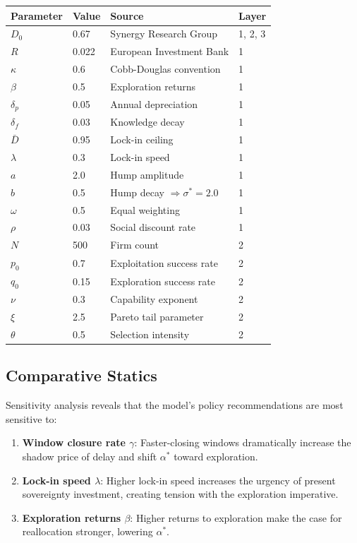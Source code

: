 \documentclass[11pt,a4paper]{article}
\theoremstyle{remark}
\begin{document}
\begin{center}
\begin{tabular}{llll}
\toprule
\textbf{Parameter} & \textbf{Value} & \textbf{Source} & \textbf{Layer} \\
\midrule
$D_0$ & 0.67 & Synergy Research Group & 1, 2, 3 \\
$R$ & 0.022 & European Investment Bank & 1 \\
$\kappa$ & 0.6 & Cobb-Douglas convention & 1 \\
$\beta$ & 0.5 & Exploration returns & 1 \\
$\delta_p$ & 0.05 & Annual depreciation & 1 \\
$\delta_f$ & 0.03 & Knowledge decay & 1 \\
$\bar{D}$ & 0.95 & Lock-in ceiling & 1 \\
$\lambda$ & 0.3 & Lock-in speed & 1 \\
$a$ & 2.0 & Hump amplitude & 1 \\
$b$ & 0.5 & Hump decay $\Rightarrow \sigma^* = 2.0$ & 1 \\
$\omega$ & 0.5 & Equal weighting & 1 \\
$\rho$ & 0.03 & Social discount rate & 1 \\
$N$ & 500 & Firm count & 2 \\
$p_0$ & 0.7 & Exploitation success rate & 2 \\
$q_0$ & 0.15 & Exploration success rate & 2 \\
$\nu$ & 0.3 & Capability exponent & 2 \\
$\xi$ & 2.5 & Pareto tail parameter & 2 \\
$\theta$ & 0.5 & Selection intensity & 2 \\
\bottomrule
\end{tabular}
\end{center}

\subsection{Comparative Statics}

Sensitivity analysis reveals that the model's policy recommendations are most sensitive to:
\begin{enumerate}
    \item \textbf{Window closure rate $\gamma$}: Faster-closing windows dramatically increase the shadow price of delay and shift $\alpha^*$ toward exploration.
    \item \textbf{Lock-in speed $\lambda$}: Higher lock-in speed increases the urgency of present sovereignty investment, creating tension with the exploration imperative.
    \item \textbf{Exploration returns $\beta$}: Higher returns to exploration make the case for reallocation stronger, lowering $\alpha^*$.
\end{enumerate}
\end{document}
